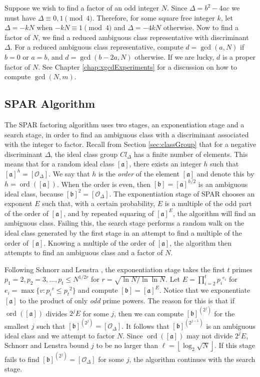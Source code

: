 \documentclass{ucalgthes1}
\theoremstyle{definition}
\DeclareMathOperator{\ord}{ord}
\newcommand{\floor}[1]{\left\lfloor #1 \right\rfloor}
\newcommand{\ideal}{\mathfrak}
\newcommand{\idealclass}[1]{\left[ \ideal #1 \right]}
\newcommand{\aclass}{\idealclass a}
\newcommand{\bclass}{\idealclass b}
\newcommand{\idclass}{[\mathcal O_\Delta]}
\begin{document}
Suppose we wish to find a factor of an odd integer $N$. Since $\Delta = b^2 - 4ac$ we must have $\Delta \equiv 0, 1 \pmod 4$.  Therefore, for some square free integer $k$, let $\Delta = -kN$ when $-kN \equiv 1 \pmod 4$ and $\Delta = -4kN$ otherwise.  Now to find a factor of $N$, we find a reduced ambiguous class representative with discriminant $\Delta$.  For a reduced ambiguous class representative, compute $d = \gcd(a, N)$ if $b = 0$ or $a = b$, and $d = \gcd(b-2a, N)$ otherwise.  If we are lucky, $d$ is a proper factor of $N$. See Chapter \ref{chap:xgcdExperiments} for a discussion on how to compute $\gcd(N, m)$.


\subsection{SPAR Algorithm}
\label{subsec:sparAlg}

The SPAR factoring algorithm uses two stages, an exponentiation stage and a search stage, in order to find an ambiguous class with a discriminant associated with the integer to factor.  Recall from Section \ref{sec:classGroup} that for a negative discriminant $\Delta$, the ideal class group $Cl_\Delta$ has a finite number of elements.  This means that for a random ideal class $\aclass$, there exists an integer $h$ such that $\aclass^h = \idclass$. We say that $h$ is the \emph{order} of the element $\aclass$ and denote this by $h = \ord(\aclass)$.  When the order is even, then $\bclass = \aclass^{h/2}$ is an ambiguous ideal class, because $\bclass^2 = \idclass$.   The exponentiation stage of SPAR chooses an exponent $E$ such that, with a certain probability, $E$ is a multiple of the odd part of the order of $\aclass$, and by repeated squaring of $\aclass^E$, the algorithm will find an ambiguous class.  Failing this, the search stage performs a random walk on the ideal class generated by the first stage in an attempt to find a multiple of the order of $\aclass$.  Knowing a multiple of the order of $\aclass$, the algorithm then attempts to find an ambiguous class and a factor of $N$.

Following Schnorr and Lenstra \cite{Schnorr1984}, the exponentiation stage takes the first $t$ primes $p_1 = 2, p_2 = 3, ..., p_t \le N^{1/2r}$ for $r = \sqrt{\ln N / \ln \ln N}$.  Let $E = \prod_{i=2}^t {p_i}^{e_i}$ for $e_i = \max \{ v : {p_i}^v \le {p_t}^2 \}$ and compute $\bclass = \aclass^E$.  Notice that we exponentiate $\aclass$ to the product of only \emph{odd} prime powers.  The reason for this is that if $\ord(\aclass)$ divides $2^j E$ for some $j$, then we can compute $\bclass^{\left(2^j\right)}$ for the smallest $j$ such that $\bclass^{\left(2^j\right)} = \idclass$.  It follows that $\bclass^{\left(2^{j-1}\right)}$ is an ambiguous ideal class and we attempt to factor $N$.  Since $\ord(\aclass)$ may not divide $2^jE$, Schnorr and Lenstra \cite[p.291]{Schnorr1984} bound $j$ to be no larger than $\ell = \floor{\log_2{\sqrt N}}$.  If this stage fails to find $\bclass^{\left(2^j\right)} = \idclass$ for some $j$, the algorithm continues with the search stage.
\end{document}
